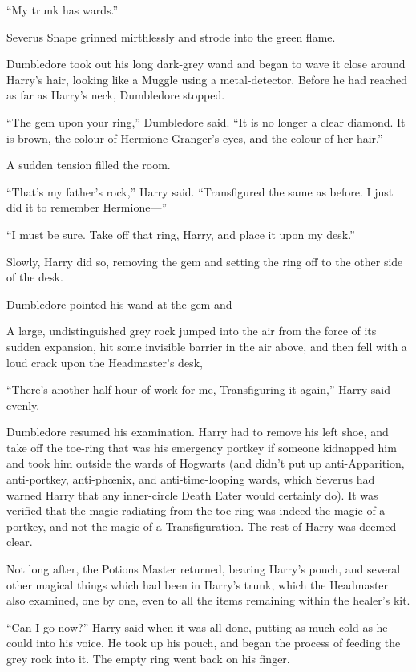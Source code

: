 “My trunk has wards.”

Severus Snape grinned mirthlessly and strode into the green flame.

Dumbledore took out his long dark-grey wand and began to wave it close around Harry’s hair, looking like a Muggle using a metal-detector. Before he had reached as far as Harry’s neck, Dumbledore stopped.

“The gem upon your ring,” Dumbledore said. “It is no longer a clear diamond. It is brown, the colour of Hermione Granger’s eyes, and the colour of her hair.”

A sudden tension filled the room.

“That’s my father’s rock,” Harry said. “Transfigured the same as before. I just did it to remember Hermione—”

“I must be sure. Take off that ring, Harry, and place it upon my desk.”

Slowly, Harry did so, removing the gem and setting the ring off to the other side of the desk.

Dumbledore pointed his wand at the gem and—

A large, undistinguished grey rock jumped into the air from the force of its sudden expansion, hit some invisible barrier in the air above, and then fell with a loud crack upon the Headmaster’s desk,

“There’s another half-hour of work for me, Transfiguring it again,” Harry said evenly.

Dumbledore resumed his examination. Harry had to remove his left shoe, and take off the toe-ring that was his emergency portkey if someone kidnapped him and took him outside the wards of Hogwarts (and didn’t put up anti-Apparition, anti-portkey, anti-phœnix, and anti-time-looping wards, which Severus had warned Harry that any inner-circle Death Eater would certainly do). It was verified that the magic radiating from the toe-ring was indeed the magic of a portkey, and not the magic of a Transfiguration. The rest of Harry was deemed clear.

Not long after, the Potions Master returned, bearing Harry’s pouch, and several other magical things which had been in Harry’s trunk, which the Headmaster also examined, one by one, even to all the items remaining within the healer’s kit.

“Can I go now?” Harry said when it was all done, putting as much cold as he could into his voice. He took up his pouch, and began the process of feeding the grey rock into it. The empty ring went back on his finger.

